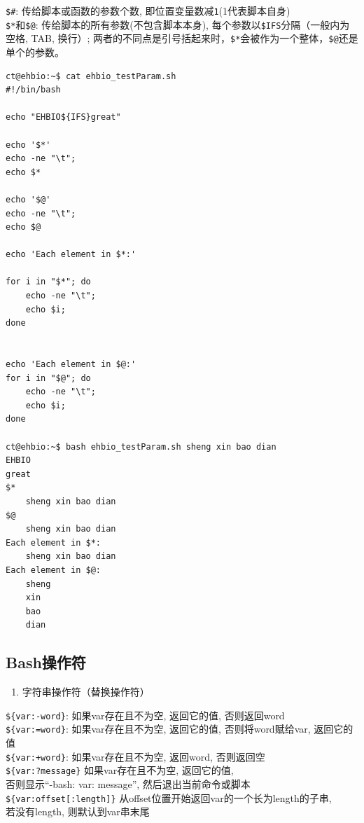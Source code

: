 \documentclass[]{article}
\providecommand{\tightlist}{%
  \setlength{\itemsep}{0pt}\setlength{\parskip}{0pt}}
\numberwithin{figure}{section}
\numberwithin{table}{section}
\begin{document}
\texttt{\$\#}: 传给脚本或函数的参数个数, 即位置变量数减\texttt{1}(1代表脚本自身)\\
\texttt{\$*}和\texttt{\$@}: 传给脚本的所有参数(不包含脚本本身), 每个参数以\texttt{\$IFS}分隔（一般内为空格, TAB, 换行）; 两者的不同点是引号括起来时，\texttt{\$*}会被作为一个整体，\texttt{\$@}还是单个的参数。

\begin{verbatim}
ct@ehbio:~$ cat ehbio_testParam.sh
#!/bin/bash

echo "EHBIO${IFS}great"

echo '$*'
echo -ne "\t";
echo $*

echo '$@'
echo -ne "\t";
echo $@

echo 'Each element in $*:'

for i in "$*"; do
	echo -ne "\t";
	echo $i;
done


echo 'Each element in $@:'
for i in "$@"; do
	echo -ne "\t";
	echo $i;
done

ct@ehbio:~$ bash ehbio_testParam.sh sheng xin bao dian
EHBIO 	
great
$*
	sheng xin bao dian
$@
	sheng xin bao dian
Each element in $*:
	sheng xin bao dian
Each element in $@:
	sheng
	xin
	bao
	dian
\end{verbatim}

\hypertarget{bash_operator}{%
\subsection{Bash操作符}\label{bash_operator}}

\begin{enumerate}
\def\labelenumi{\arabic{enumi}.}
\tightlist
\item
  字符串操作符（替换操作符）
\end{enumerate}

\texttt{\$\{var:-word\}}: 如果var存在且不为空, 返回它的值, 否则返回word\\
\texttt{\$\{var:=word\}}: 如果var存在且不为空, 返回它的值, 否则将word赋给var, 返回它的值\\
\texttt{\$\{var:+word\}}: 如果var存在且不为空, 返回word, 否则返回空\\
\texttt{\$\{var:?message\}} 如果var存在且不为空, 返回它的值,\\
否则显示``-bash: var: message'', 然后退出当前命令或脚本\\
\texttt{\$\{var:offset{[}:length{]}\}} 从offset位置开始返回var的一个长为length的子串,\\
若没有length, 则默认到var串末尾
\end{document}
